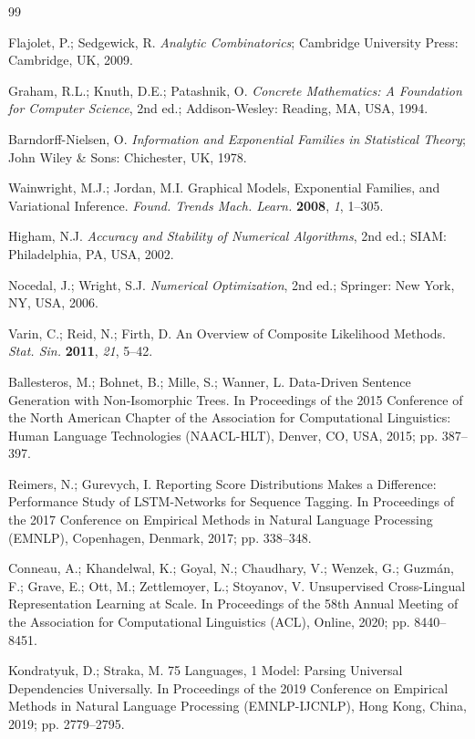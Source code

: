 \documentclass[11pt,a4paper]{article}
\begin{document}
\begin{thebibliography}{99}

Flajolet, P.; Sedgewick, R. \textit{Analytic Combinatorics}; Cambridge University Press: Cambridge, UK, 2009.

Graham, R.L.; Knuth, D.E.; Patashnik, O. \textit{Concrete Mathematics: A Foundation for Computer Science}, 2nd ed.; Addison-Wesley: Reading, MA, USA, 1994.

Barndorff-Nielsen, O. \textit{Information and Exponential Families in Statistical Theory}; John Wiley \& Sons: Chichester, UK, 1978.

Wainwright, M.J.; Jordan, M.I. Graphical Models, Exponential Families, and Variational Inference. \textit{Found. Trends Mach. Learn.} \textbf{2008}, \textit{1}, 1--305.

Higham, N.J. \textit{Accuracy and Stability of Numerical Algorithms}, 2nd ed.; SIAM: Philadelphia, PA, USA, 2002.

Nocedal, J.; Wright, S.J. \textit{Numerical Optimization}, 2nd ed.; Springer: New York, NY, USA, 2006.

Varin, C.; Reid, N.; Firth, D. An Overview of Composite Likelihood Methods. \textit{Stat. Sin.} \textbf{2011}, \textit{21}, 5--42.

Ballesteros, M.; Bohnet, B.; Mille, S.; Wanner, L. Data-Driven Sentence Generation with Non-Isomorphic Trees. In Proceedings of the 2015 Conference of the North American Chapter of the Association for Computational Linguistics: Human Language Technologies (NAACL-HLT), Denver, CO, USA, 2015; pp. 387--397.

Reimers, N.; Gurevych, I. Reporting Score Distributions Makes a Difference: Performance Study of LSTM-Networks for Sequence Tagging. In Proceedings of the 2017 Conference on Empirical Methods in Natural Language Processing (EMNLP), Copenhagen, Denmark, 2017; pp. 338--348.

Conneau, A.; Khandelwal, K.; Goyal, N.; Chaudhary, V.; Wenzek, G.; Guzm\'an, F.; Grave, E.; Ott, M.; Zettlemoyer, L.; Stoyanov, V. Unsupervised Cross-Lingual Representation Learning at Scale. In Proceedings of the 58th Annual Meeting of the Association for Computational Linguistics (ACL), Online, 2020; pp. 8440--8451.

Kondratyuk, D.; Straka, M. 75 Languages, 1 Model: Parsing Universal Dependencies Universally. In Proceedings of the 2019 Conference on Empirical Methods in Natural Language Processing (EMNLP-IJCNLP), Hong Kong, China, 2019; pp. 2779--2795.

\end{thebibliography}
\end{document}
